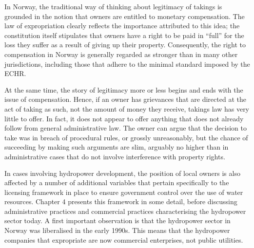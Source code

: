 In Norway, the traditional way of thinking about legitimacy of takings is grounded in the notion that owners are entitled to monetary compensation. The law of expropriation clearly reflects the importance attributed to this idea; the constitution itself stipulates that owners have a right to be paid in ``full'' for the loss they suffer as a result of giving up their property. Consequently, the right to compensation in Norway is generally regarded as stronger than in many other jurisdictions, including those that adhere to the minimal standard imposed by the ECHR.

At the same time, the story of legitimacy more or less begins and ends with the issue of compensation. Hence, if an owner has grievances that are directed at the act of taking as such, not the amount of money they receive, takings law has very little to offer. In fact, it does not appear to offer anything that does not already follow from general administrative law. The owner can argue that the decision to take was in breach of procedural rules, or grossly unreasonably, but the chance of succeeding by making such arguments are slim, arguably no higher than in administrative cases that do not involve interference with property rights.


In cases involving hydropower development, the position of local owners is also affected by a number of additional variables that pertain specifically to the licensing framework in place to ensure government control over the use of water resources. Chapter 4 presents this framework in some detail, before discussing administrative practices and commercial practices characterising the hydropower sector today. A first important observation is that the hydropower sector in Norway was liberalised in the early 1990s. This means that the hydropower companies that expropriate are now commercial enterprises, not public utilities. 

